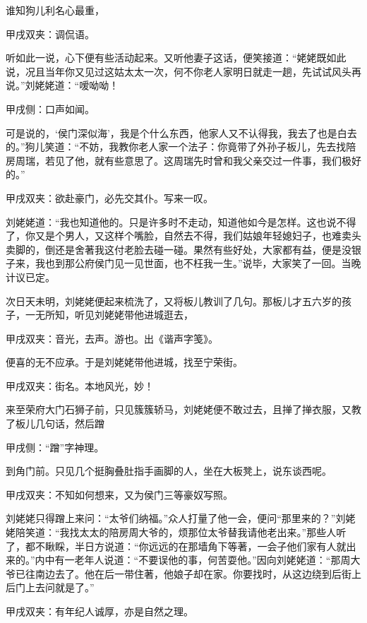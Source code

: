 \begin{parag}
    谁知狗儿利名心最重，\begin{note}甲戌双夹：调侃语。\end{note}听如此一说，心下便有些活动起来。又听他妻子这话，便笑接道：“姥姥既如此说，况且当年你又见过这姑太太一次，何不你老人家明日就走一趟，先试试风头再说。”刘姥姥道：“嗳呦呦！\begin{note}甲戌侧：口声如闻。\end{note}可是说的，‘侯门深似海’，我是个什么东西，他家人又不认得我，我去了也是白去的。”狗儿笑道：“不妨，我教你老人家一个法子：你竟带了外孙子板儿，先去找陪房周瑞，若见了他，就有些意思了。这周瑞先时曾和我父亲交过一件事，我们极好的。”\begin{note}甲戌双夹：欲赴豪门，必先交其仆。写来一叹。\end{note}刘姥姥道：“我也知道他的。只是许多时不走动，知道他如今是怎样。这也说不得了，你又是个男人，又这样个嘴脸，自然去不得，我们姑娘年轻媳妇子，也难卖头卖脚的，倒还是舍著我这付老脸去碰一碰。果然有些好处，大家都有益，便是没银子来，我也到那公府侯门见一见世面，也不枉我一生。”说毕，大家笑了一回。当晚计议已定。
\end{parag}


\begin{parag}
    次日天未明，刘姥姥便起来梳洗了，又将板儿教训了几句。那板儿才五六岁的孩子，一无所知，听见刘姥姥带他进城逛去，\begin{note}甲戌双夹：音光，去声。游也。出《谐声字笺》。\end{note}便喜的无不应承。于是刘姥姥带他进城，找至宁荣街。\begin{note}甲戌双夹：街名。本地风光，妙！\end{note}来至荣府大门石狮子前，只见簇簇轿马，刘姥姥便不敢过去，且掸了掸衣服，又教了板儿几句话，然后蹭\begin{note}甲戌侧：“蹭”字神理。\end{note}到角门前。只见几个挺胸叠肚指手画脚的人，坐在大板凳上，说东谈西呢。\begin{note}甲戌双夹：不知如何想来，又为侯门三等豪奴写照。\end{note}刘姥姥只得蹭上来问：“太爷们纳福。”众人打量了他一会，便问“那里来的？”刘姥姥陪笑道：“我找太太的陪房周大爷的，烦那位太爷替我请他老出来。”那些人听了，都不瞅睬，半日方说道：“你远远的在那墙角下等著，一会子他们家有人就出来的。”内中有一老年人说道：“不要误他的事，何苦耍他。”因向刘姥姥道：“那周大爷已往南边去了。他在后一带住著，他娘子却在家。你要找时，从这边绕到后街上后门上去问就是了。”\begin{note}甲戌双夹：有年纪人诚厚，亦是自然之理。\end{note}
\end{parag}


